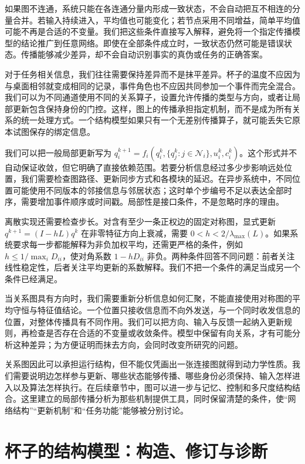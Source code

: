 如果图不连通，系统只能在各连通分量内形成一致状态，不会自动把互不相连的分量合并。若输入持续进入，平均值也可能变化；若节点采用不同增益，简单平均值可能不再是合适的不变量。我们把这些条件直接写入解释，避免将一个指定传播模型的结论推广到任意网络。即使在全部条件成立时，一致状态仍然可能是错误状态。传播能够减少差异，却不会自动识别事实的真伪或任务的正确答案。

对于任务相关信息，我们往往需要保持差异而不是抹平差异。杯子的温度不应因为与桌面相邻就变成相同的记录，事件角色也不应因共同参加一个事件而完全混合。我们可以为不同通道使用不同的关系算子，设置允许传播的类型与方向，或者让局部更新包含保持身份的门控。这样，图上的传播承担指定机制，而不是成为所有关系的统一处理方式。一个结构模型如果只有一个无差别传播算子，就可能丢失它原本试图保存的绑定信息。

我们可以把一般局部更新写为 $q_i^{k+1}=f_i(q_i^k,\{q_j^k:j\in\mathcal N_i\},u_i^k,c_i^k)$。这个形式并不自动保证收敛，但它明确了直接依赖范围。若要分析信息经过多少步影响远处位置，我们需要检查图路径、更新同步方式和各模块的延迟。在异步系统中，不同位置可能使用不同版本的邻接信息与邻居状态；这时单个步编号不足以表达全部时序，需要增加事件顺序或时间戳。局部性是接口条件，不是忽略时序的理由。

离散实现还需要检查步长。对含有至少一条正权边的固定对称图，显式更新 $q^{k+1}=(I-hL)q^k$ 在非零特征方向上衰减，需要 $0<h<2/\lambda_{\max}(L)$。如果系统要求每一步都能解释为非负加权平均，还需更严格的条件，例如 $h\leq1/\max_iD_{ii}$，使对角系数 $1-hD_{ii}$ 非负。两种条件回答不同问题：前者关注线性稳定性，后者关注平均更新的系数解释。我们不把一个条件的满足当成另一个条件已经满足。

当关系图具有方向时，我们需要重新分析信息如何汇聚，不能直接使用对称图的平均守恒与特征值结论。一个位置只接收信息而不向外发送，与一个同时收发信息的位置，对整体传播具有不同作用。我们可以把方向、输入与反馈一起纳入更新规则，再检查是否存在合适的不变量或收敛条件。模型中保留有向关系，才有可能分析这种差异；为方便证明而抹去方向，会同时改变所研究的问题。

关系图因此可以承担运行结构，但不能仅凭画出一张连接图就得到动力学性质。我们需要说明边怎样参与更新、哪些状态能够传播、哪些身份必须保持、输入怎样进入以及算法怎样执行。在后续章节中，图可以进一步与记忆、控制和多尺度结构结合。这里建立的局部传播分析为那些机制提供工具，同时保留清楚的条件，使“网络结构”“更新机制”和“任务功能”能够被分别讨论。

\section{杯子的结构模型：构造、修订与诊断}
\label{sec:cup_example}

